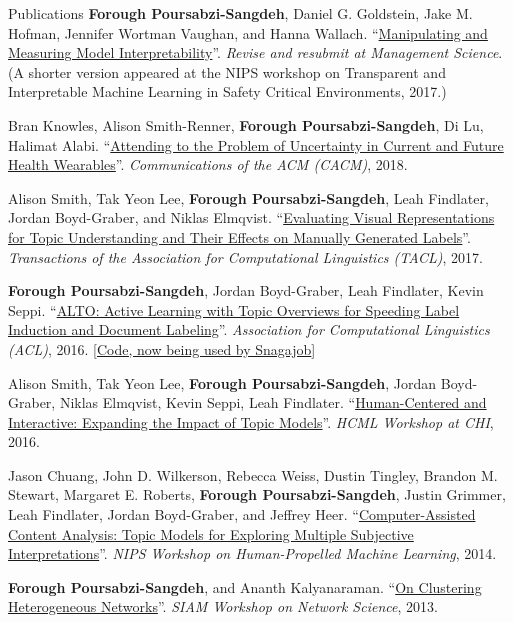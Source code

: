 \documentclass{resume} %
\begin{document}
\begin{rSection}{Publications}
\textbf{Forough Poursabzi-Sangdeh}, Daniel G. Goldstein, Jake M. Hofman, Jennifer Wortman Vaughan, and Hanna Wallach. ``\href{https://arxiv.org/abs/1802.07810}{Manipulating and Measuring Model Interpretability}''. \textit{Revise and resubmit at Management Science}. (A shorter version appeared at the NIPS workshop on Transparent and Interpretable Machine Learning in Safety Critical Environments, 2017.)

Bran Knowles, Alison Smith-Renner, \textbf{Forough Poursabzi-Sangdeh}, Di Lu, Halimat Alabi. ``\href{http://eprints.lancs.ac.uk/124041/1/Knowles_2018_CACM_Uncertainty.pdf}{Attending to the Problem of Uncertainty in Current and Future Health Wearables}''. \textit{Communications of the ACM (CACM)}, 2018.

Alison Smith, Tak Yeon Lee, \textbf{Forough Poursabzi-Sangdeh}, Leah Findlater, Jordan Boyd-Graber, and Niklas Elmqvist. ``\href{http://www.aclweb.org/anthology/Q17-1001}{Evaluating Visual Representations for Topic Understanding and Their Effects on Manually Generated Labels}''. \textit{Transactions of the Association for Computational Linguistics (TACL)}, 2017.

\textbf{Forough Poursabzi-Sangdeh}, Jordan Boyd-Graber, Leah Findlater, Kevin Seppi. ``\href{http://www.aclweb.org/anthology/P16-1110}{ALTO: Active Learning with Topic Overviews for Speeding Label Induction and Document Labeling}''. \textit{Association for Computational Linguistics (ACL)}, 2016. [\href{https://github.com/Snagajob/alto-boot}{Code, now being used by Snagajob}]

Alison Smith, Tak Yeon Lee, \textbf{Forough Poursabzi-Sangdeh}, Jordan Boyd-Graber, Niklas Elmqvist, Kevin Seppi, Leah Findlater. ``\href{http://www.doc.gold.ac.uk/~mas02mg/HCML2016/HCML2016_paper_18.pdf}{Human-Centered and Interactive: Expanding the Impact of Topic Models}''. \textit{HCML Workshop at CHI}, 2016.

Jason Chuang, John D. Wilkerson, Rebecca Weiss, Dustin Tingley, Brandon M. Stewart, Margaret E. Roberts, \textbf{Forough Poursabzi-Sangdeh}, Justin Grimmer, Leah Findlater, Jordan Boyd-Graber, and Jeffrey Heer. ``\href{https://scholar.princeton.edu/sites/default/files/bstewart/files/nipshpml2014.pdf}{Computer-Assisted Content Analysis: Topic Models for Exploring Multiple Subjective Interpretations}''. \textit{NIPS Workshop on Human-Propelled Machine Learning}, 2014.

\textbf{Forough Poursabzi-Sangdeh}, and Ananth Kalyanaraman. ``\href{http://www.eecs.wsu.edu/~ananth/papers/Poursabzi_SIAMNetworkScience13_preprint.pdf}{On Clustering Heterogeneous Networks}''. \textit{SIAM Workshop on Network Science}, 2013.
\end{rSection}
\end{document}
